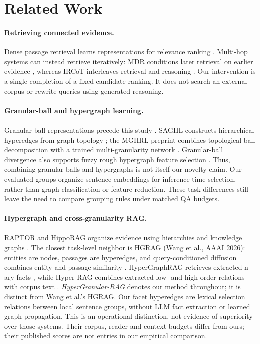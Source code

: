 \documentclass[11pt]{article}
\begin{document}
\section{Related Work}
\paragraph{Retrieving connected evidence.}
Dense passage retrieval learns representations for relevance ranking
\citep{karpukhin2020dpr}. Multi-hop systems can instead retrieve iteratively:
MDR conditions later retrieval on earlier evidence \citep{xiong2021mdr},
whereas IRCoT interleaves retrieval and reasoning
\citep{trivedi2023ircot}. Our intervention is a single completion of a fixed
candidate ranking. It does not search an external corpus or rewrite queries
using generated reasoning.

\paragraph{Granular-ball and hypergraph learning.}
Granular-ball representations precede this study
\citep{xia2019granularball}. SAGHL constructs hierarchical hyperedges from
graph topology \citep{ni2026saghl}; the MGHRL preprint combines topological
ball decomposition with a trained multi-granularity network
\citep{zhao2026mghrl}. Granular-ball divergence also supports fuzzy rough
hypergraph feature selection \citep{li2026gbfrh}. Thus, combining granular
balls and hypergraphs is not itself our novelty claim. Our evaluated groups
organize sentence embeddings for inference-time selection, rather than graph
classification or feature reduction. These task differences still leave the
need to compare grouping rules under matched QA budgets.

\paragraph{Hypergraph and cross-granularity RAG.}
RAPTOR and HippoRAG organize evidence using hierarchies and knowledge graphs
\citep{sarthi2024raptor,gutierrez2024hipporag}.
The closest task-level neighbor is HGRAG (Wang et al., AAAI 2026): entities
are nodes, passages are hyperedges, and query-conditioned diffusion combines
entity and passage similarity \citep{wang2026crossgranularity}.
HyperGraphRAG retrieves extracted n-ary facts
\citep{luo2025hypergraphrag}, while Hyper-RAG combines extracted low- and
high-order relations with corpus text \citep{feng2026hyperrag}.
\emph{HyperGranular-RAG} denotes our method throughout; it is distinct from
Wang et al.'s HGRAG. Our facet hyperedges are lexical selection relations
between local sentence groups, without LLM fact extraction or learned graph
propagation. This is an operational distinction, not evidence of superiority
over those systems. Their corpus, reader and context budgets differ from ours;
their published scores are not entries in our empirical comparison.
\end{document}
